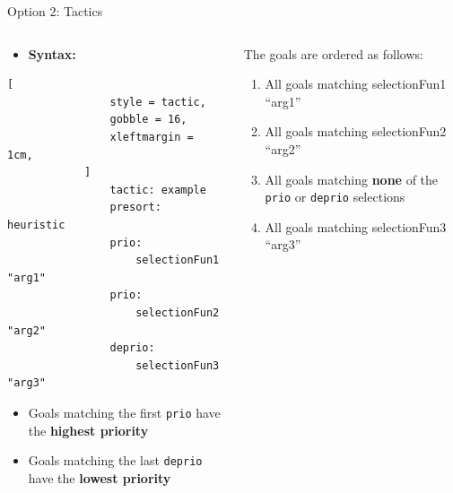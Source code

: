 \documentclass[11pt,aspectratio=169]{beamer}
\begin{document}
\begin{frame}[fragile,t]{Option 2: Tactics}
    \vsep
    \vspace*{-.8cm}
    \begin{columns}[T]
        \begin{column}{0.5\textwidth}
            \begin{itemize}
                \item \textbf{Syntax:}
            \end{itemize}
            \vspace*{.15cm}
            \begin{lstlisting}[
                style = tactic,
                gobble = 16,
                xleftmargin = 1cm,
            ]
                tactic: example
                presort: heuristic
                prio:
                    selectionFun1 "arg1"
                prio:
                    selectionFun2 "arg2"
                deprio:
                    selectionFun3 "arg3"
            \end{lstlisting}

            \begin{itemize}
                \item Goals matching the first \verb|prio| have the
                      \textbf{highest priority}
                \item Goals matching the last \verb|deprio| have the
                      \textbf{lowest priority}
            \end{itemize}
        \end{column}
        \begin{column}{0.5\textwidth}

            The goals are ordered as follows:
            \begin{enumerate}
                \item All goals matching selectionFun1 ``arg1''
                \item All goals matching selectionFun2 ``arg2''
                \item All goals matching \textbf{none} of the
                      \verb|prio| or \verb|deprio| selections
                \item All goals matching selectionFun3 ``arg3''
            \end{enumerate}
        \end{column}
    \end{columns}
\end{frame}
\end{document}
